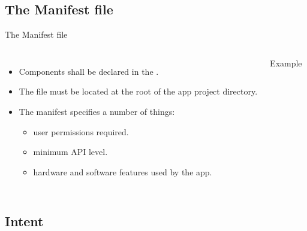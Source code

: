 \documentclass{beamer}
\begin{document}
\subsection{The Manifest file}

\begin{frame}{The Manifest file}
\begin{columns}[c]
  \begin{itemize}\itemsep10pt
    \item Components shall be declared in the .
    \item The file must be located at the root of the app project directory.
    \item The manifest specifies a number of things:
    \begin{itemize}
      \item user permissions required.
      \item minimum API level.
      \item hardware and software features used by the app.
    \end{itemize}
  \end{itemize}
    \begin{exampleblock}{Example}
      
    \end{exampleblock}
  \end{columns}
\end{frame}

\subsection{Intent}
\end{document}

